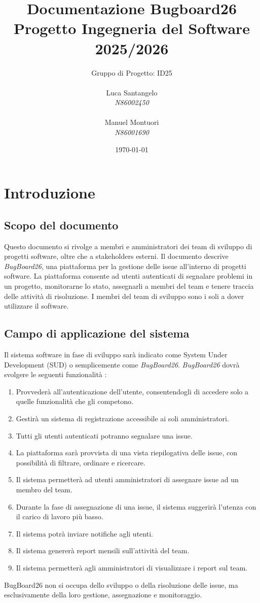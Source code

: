 \documentclass[a4paper,12pt]{article}
\title{\textbf{Documentazione Bugboard26} \\ \large Progetto Ingegneria del Software 2025/2026  }
\author{Gruppo di Progetto: ID25\\
\begin{minipage}[t]{0.45\textwidth}
\raggedright
Luca Santangelo\\
\textit{N86002450}\\
\end{minipage}
\hfill
\begin{minipage}[t]{0.45\textwidth}
\raggedleft
Manuel Montuori\\
\textit{N86001690}\\
\end{minipage}
}
\date{\today}
\begin{document}
\maketitle
\newpage
\hypersetup{linkcolor=black} %
\tableofcontents
\hypersetup{linkcolor=blue} %
\newpage

\section{Introduzione}
\subsection{Scopo del documento}
Questo documento si rivolge a membri e amministratori dei team di sviluppo
di progetti software, oltre che a stakeholders esterni. Il documento descrive \textit{BugBoard26}, una piattaforma per la gestione delle issue all'interno di progetti software.
La piattaforma consente ad utenti autenticati di segnalare problemi in un progetto, 
monitorarne lo stato, assegnarli a membri del team e tenere traccia delle attività di risoluzione. 
I membri del team di sviluppo sono i soli a dover utilizzare il software.

\subsection{Campo di applicazione del sistema}
Il sistema software in fase di sviluppo sarà indicato come System Under Development (SUD) o semplicemente come \textit{BugBoard26}.
\textit{BugBoard26} dovrà svolgere le seguenti funzionalità :
\begin{enumerate}
    \item Provvederà all'autenticazione  dell'utente, consentendogli di accedere solo a quelle funzionalità che gli competono.
    \item Gestirà un sistema di registrazione accessibile ai soli amministratori.
    \item Tutti gli utenti autenticati potranno segnalare una issue.
    \item La piattaforma sarà provvista di una vista riepilogativa  delle issue, con possibilità di filtrare, ordinare e ricercare.
    \item Il sistema permetterà ad utenti amministratori di assegnare  issue ad un membro del team. 
    \item Durante la fase di assegnazione di una issue, il sistema suggerirà l'utenza con il  carico di lavoro più basso.
    \item Il sistema potrà inviare notifiche agli utenti.
    \item Il sistema genererà report mensili sull'attività del team.
    \item Il sistema permetterà agli amministratori di visualizzare
     i report sul team.
\end{enumerate}
BugBoard26 non si occupa dello sviluppo o della risoluzione delle issue, ma esclusivamente della loro gestione, assegnazione e monitoraggio.
\end{document}
